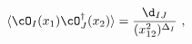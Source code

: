 \begin{equation} 
\label{2pt}
\langle {\cO}_I (x_1) \cO^{\dagger}_J(x_2) \rangle = 
\frac{\d_{IJ}}{(x_{12}^2)^{\Delta_I}} \ ,
\end{equation}

